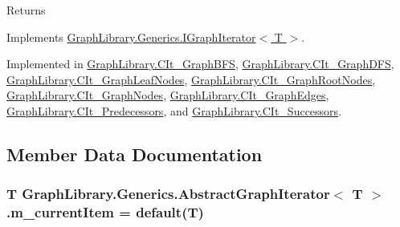 \begin{DoxyReturn}{Returns}

\end{DoxyReturn}


Implements \hyperlink{interface_graph_library_1_1_generics_1_1_i_graph_iterator}{Graph\+Library.\+Generics.\+I\+Graph\+Iterator$<$ T $>$}.



Implemented in \hyperlink{class_graph_library_1_1_c_it___graph_b_f_s_ab836a3c5caca3c8d63d56827b677a243}{Graph\+Library.\+C\+It\+\_\+\+Graph\+B\+F\+S}, \hyperlink{class_graph_library_1_1_c_it___graph_d_f_s_a89cf17a75298dabb07d6d0ce06895e78}{Graph\+Library.\+C\+It\+\_\+\+Graph\+D\+F\+S}, \hyperlink{class_graph_library_1_1_c_it___graph_leaf_nodes_aa6f30fbeebae338fa9d77455027679f0}{Graph\+Library.\+C\+It\+\_\+\+Graph\+Leaf\+Nodes}, \hyperlink{class_graph_library_1_1_c_it___graph_root_nodes_a4606ecd1ef26c19634171ccd81e18816}{Graph\+Library.\+C\+It\+\_\+\+Graph\+Root\+Nodes}, \hyperlink{class_graph_library_1_1_c_it___graph_nodes_a669edb9e8d59c4dcdbb70fe15e89104a}{Graph\+Library.\+C\+It\+\_\+\+Graph\+Nodes}, \hyperlink{class_graph_library_1_1_c_it___graph_edges_ab14c4a444a51dac76ed83211798f05a8}{Graph\+Library.\+C\+It\+\_\+\+Graph\+Edges}, \hyperlink{class_graph_library_1_1_c_it___predecessors_a560fdfb437097d41b4c7dd15905eae99}{Graph\+Library.\+C\+It\+\_\+\+Predecessors}, and \hyperlink{class_graph_library_1_1_c_it___successors_abeba92b544a86d4385e9120289801df3}{Graph\+Library.\+C\+It\+\_\+\+Successors}.



\subsection{Member Data Documentation}
\hypertarget{class_graph_library_1_1_generics_1_1_abstract_graph_iterator_a19c7904539e8519162a4c42739d37757}{}
\subsubsection[{m\+\_\+current\+Item}]{\setlength{\rightskip}{0pt plus 5cm}T {\bf Graph\+Library.\+Generics.\+Abstract\+Graph\+Iterator}$<$ T $>$.m\+\_\+current\+Item = default(T)\hspace{0.3cm}{\ttfamily [protected]}}\label{class_graph_library_1_1_generics_1_1_abstract_graph_iterator_a19c7904539e8519162a4c42739d37757}


